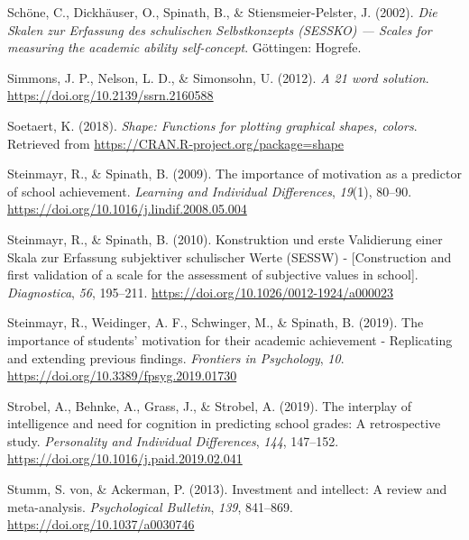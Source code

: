 \documentclass[
  man]{apa6}
\newlength{\cslhangindent}
\newlength{\cslentryspacingunit} %
\newenvironment{CSLReferences}[2] %
 {%
  \setlength{\parindent}{0pt}
  \ifodd #1
  \let\oldpar\par
  \def\par{\hangindent=\cslhangindent\oldpar}
  \fi
  \setlength{\parskip}{#2\cslentryspacingunit}
 }%
 {}
\begin{document}
\begin{CSLReferences}{1}{0}
\leavevmode{}%
Schöne, C., Dickhäuser, O., Spinath, B., \& Stiensmeier-Pelster, J. (2002). \emph{{Die Skalen zur Erfassung des schulischen Selbstkonzepts (SESSKO) --- Scales for measuring the academic ability self-concept}}. G{ö}ttingen: Hogrefe.

\leavevmode{}%
Simmons, J. P., Nelson, L. D., \& Simonsohn, U. (2012). \emph{A 21 word solution}. \url{https://doi.org/10.2139/ssrn.2160588}

\leavevmode{}%
Soetaert, K. (2018). \emph{Shape: Functions for plotting graphical shapes, colors}. Retrieved from \url{https://CRAN.R-project.org/package=shape}

\leavevmode{}%
Steinmayr, R., \& Spinath, B. (2009). The importance of motivation as a predictor of school achievement. \emph{Learning and Individual Differences}, \emph{19}(1), 80--90. \url{https://doi.org/10.1016/j.lindif.2008.05.004}

\leavevmode{}%
Steinmayr, R., \& Spinath, B. (2010). {Konstruktion und erste Validierung einer Skala zur Erfassung subjektiver schulischer Werte (SESSW) - {[}Construction and first validation of a scale for the assessment of subjective values in school{]}}. \emph{Diagnostica}, \emph{56}, 195--211. \url{https://doi.org/10.1026/0012-1924/a000023}

\leavevmode{}%
Steinmayr, R., Weidinger, A. F., Schwinger, M., \& Spinath, B. (2019). The importance of students' motivation for their academic achievement - {R}eplicating and extending previous findings. \emph{Frontiers in Psychology}, \emph{10}. \url{https://doi.org/10.3389/fpsyg.2019.01730}

\leavevmode{}%
Strobel, A., Behnke, A., Grass, J., \& Strobel, A. (2019). The interplay of intelligence and need for cognition in predicting school grades: A retrospective study. \emph{Personality and Individual Differences}, \emph{144}, 147--152. \url{https://doi.org/10.1016/j.paid.2019.02.041}

\leavevmode{}%
Stumm, S. von, \& Ackerman, P. (2013). Investment and intellect: A review and meta-analysis. \emph{Psychological Bulletin}, \emph{139}, 841--869. \url{https://doi.org/10.1037/a0030746}


\end{CSLReferences}
\end{document}
